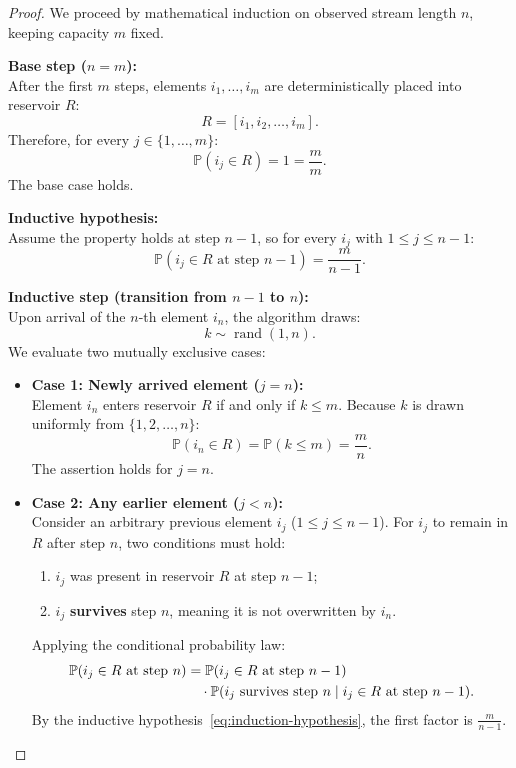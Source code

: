 \begin{proof}
We proceed by mathematical induction on observed stream length $n$, keeping capacity $m$ fixed.

\textbf{Base step ($n = m$):}\\
After the first $m$ steps, elements $i_1, \dots, i_m$ are deterministically placed into reservoir $R$:
\begin{equation}
  R = [i_1, i_2, \dots, i_m].
\end{equation}
Therefore, for every $j \in \{1, \dots, m\}$:
\begin{equation}
  \mathbb{P}(i_j \in R) = 1 = \frac{m}{m}.
\end{equation}
The base case holds.

\textbf{Inductive hypothesis:}\\
Assume the property holds at step $n - 1$, so for every $i_j$ with $1 \le j \le n - 1$:
\begin{equation}
  \mathbb{P}(i_j \in R \text{ at step } n - 1) = \frac{m}{n - 1}.
  \label{eq:induction-hypothesis}
\end{equation}

\textbf{Inductive step (transition from $n - 1$ to $n$):}\\
Upon arrival of the $n$-th element $i_n$, the algorithm draws:
\begin{equation}
  k \sim \operatorname{rand}(1, n).
\end{equation}
We evaluate two mutually exclusive cases:
\begin{itemize}
  \item \textbf{Case 1: Newly arrived element ($j = n$):}\\
  Element $i_n$ enters reservoir $R$ if and only if $k \le m$. Because $k$ is drawn uniformly from $\{1, 2, \dots, n\}$:
  \begin{equation}
    \mathbb{P}(i_n \in R) = \mathbb{P}(k \le m) = \frac{m}{n}.
  \end{equation}
  The assertion holds for $j = n$.

  \item \textbf{Case 2: Any earlier element ($j < n$):}\\
  Consider an arbitrary previous element $i_j$ ($1 \le j \le n - 1$). For $i_j$ to remain in $R$ after step $n$, two conditions must hold:
  \begin{enumerate}
    \item $i_j$ was present in reservoir $R$ at step $n - 1$;
    \item $i_j$ \textbf{survives} step $n$, meaning it is not overwritten by $i_n$.
  \end{enumerate}
  Applying the conditional probability law:
  \begin{align}
    \mathbb{P}(i_j \in R \text{ at step } n) &= \mathbb{P}(i_j \in R \text{ at step } n - 1) \notag\\
    &\quad \cdot \mathbb{P}(i_j \text{ survives step } n \mid i_j \in R \text{ at step } n - 1).
  \end{align}
  By the inductive hypothesis~\eqref{eq:induction-hypothesis}, the first factor is $\frac{m}{n - 1}$.


\end{itemize}
\end{proof}
